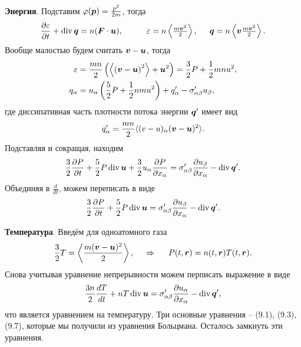 \textbf{Энергия}. Подставим $\varphi(\boldsymbol{p}) = \frac{p^2}{2m}$, тогда
\begin{equation}
	\frac{\partial \varepsilon}{\partial t} + \div \vc{q} = n (\vc{F} \cdot \vc{u}),
	\hspace{10 mm} 
	\varepsilon = n \left\langle \tfrac{m \vc{v}^2}{2}\right\rangle,
	\hspace{5 mm} 
	\vc{q} = n \left\langle \vc{v} \tfrac{m \vc{v}^2}{2}\right\rangle.
\end{equation}
Вообще малостью будем считать $\boldsymbol{v} - \boldsymbol{u}$, тогда
\begin{align}
	\varepsilon &= \frac{mn}{2} \left(
		\left\langle \left(\boldsymbol{v}-\boldsymbol{u}\right)^2\right\rangle + \boldsymbol{u}^2
	\right) = \frac{3}{2} P + \frac{1}{2} mn u^2, \\
	q_\alpha  &=  u_\alpha \left( \frac{5}{2} P + \frac{1}{2} n m u^2\right) + q_\alpha' - \sigma_{\alpha \beta}' u_\beta,
\end{align}
где диссипативная часть плотности потока энергии $\boldsymbol{q}'$ имеет вид
\begin{equation*}
	q_\alpha' = \frac{mn}{2} \langle (v-u)_\alpha (\boldsymbol{v}-\boldsymbol{u})^2\rangle.
\end{equation*}
Подставляя и сокращая, находим
\begin{equation*}
	\frac{3}{2} \frac{\partial P}{\partial t}  + \frac{5}{2} P \mathop{\mathrm{div}}\nolimits \boldsymbol{u} + \frac{3}{2} u_\alpha \frac{\partial P}{\partial x_\alpha} = \sigma_{\alpha \beta}' \frac{\partial u_\beta}{\partial x_\alpha}  - \mathop{\mathrm{div}}\nolimits \boldsymbol{q}'.
\end{equation*}
Объединяя в $\frac{d }{d t} $, можем переписать в виде
\begin{equation}
	\frac{3}{2} \frac{\partial P}{\partial t}  + \frac{5}{2} P \mathop{\mathrm{div}}\nolimits \boldsymbol{u} = \sigma_{\alpha \beta}' \frac{\partial u_\beta}{\partial x_\alpha} - \mathop{\mathrm{div}}\nolimits \boldsymbol{q}'.
\end{equation}

\textbf{Температура}. Введём для одноатомного газа
\begin{equation*}
	\frac{3}{2} T = \left\langle  \frac{m (\boldsymbol{v}-\boldsymbol{u})^2}{2}\right\rangle,
	\hspace{0.5cm} \Rightarrow \hspace{0.5cm}
	P(t, \boldsymbol{r}) = n(t, \boldsymbol{r}) T(t, \boldsymbol{r}).
\end{equation*}
Снова учитывая уравнение непрерывности можем перписать выражение в виде
\begin{equation}
	\frac{3n}{2} \frac{d T}{d t} + n T \mathop{\mathrm{div}}\nolimits \boldsymbol{u} = \sigma_{\alpha \beta}' \frac{\partial u_\alpha}{\partial x_\alpha}  - \mathop{\mathrm{div}}\nolimits \boldsymbol{q}',
\end{equation}
что является уравнением на температуру. Три основные уравнения -- (9.1), (9.3), (9.7), которые мы получили из уравнения Больцмана. Осталось замкнуть эти уравнения. 

